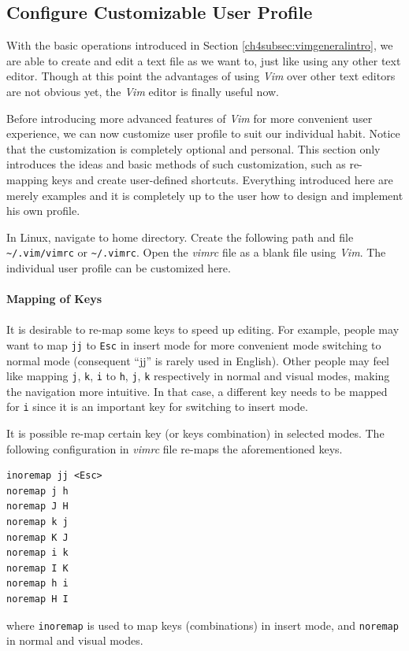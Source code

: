 \subsection{Configure Customizable User Profile}

With the basic operations introduced in Section \ref{ch4subsec:vimgeneralintro}, we are able to create and edit a text file as we want to, just like using any other text editor. Though at this point the advantages of using \textit{Vim} over other text editors are not obvious yet, the \textit{Vim} editor is finally useful now.

Before introducing more advanced features of \textit{Vim} for more convenient user experience, we can now customize user profile to suit our individual habit. Notice that the customization is completely optional and personal. This section only introduces the ideas and basic methods of such customization, such as re-mapping keys and create user-defined shortcuts. Everything introduced here are merely examples and it is completely up to the user how to design and implement his own profile.

In Linux, navigate to home directory. Create the following path and file \verb|~/.vim/vimrc| or \verb|~/.vimrc|. Open the \textit{vimrc} file as a blank file using \textit{Vim}. The individual user profile can be customized here.
\\
\\
\noindent \textbf{Mapping of Keys}
\\
\\
It is desirable to re-map some keys to speed up editing. For example, people may want to map \verb|jj| to \verb|Esc| in insert mode for more convenient mode switching to normal mode (consequent ``jj'' is rarely used in English). Other people may feel like mapping \verb|j|, \verb|k|, \verb|i| to \verb|h|, \verb|j|, \verb|k| respectively in normal and visual modes, making the navigation more intuitive. In that case, a different key needs to be mapped for \verb|i| since it is an important key for switching to insert mode.

It is possible re-map certain key (or keys combination) in selected modes. The following configuration in \textit{vimrc} file re-maps the aforementioned keys. 
\begin{verbatim}
inoremap jj <Esc>
noremap j h
noremap J H
noremap k j
noremap K J
noremap i k
noremap I K
noremap h i
noremap H I
\end{verbatim}
where \verb|inoremap| is used to map keys (combinations) in insert mode, and \verb|noremap| in normal and visual modes.

